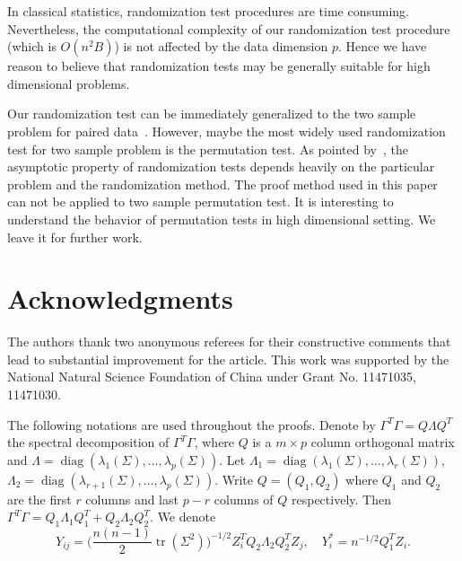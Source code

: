\documentclass[3p]{elsarticle}
\DeclareMathOperator{\mytr}{tr}
\DeclareMathOperator{\mydiag}{diag}
\theoremstyle{plain}
\theoremstyle{definition}
\theoremstyle{remark}
\begin{document}
In classical statistics, randomization test procedures are time consuming.
Nevertheless, the computational complexity of our randomization test procedure (which is $O(n^2 B)$) is not affected by the data dimension $p$. 
Hence we have reason to believe that randomization tests may be generally suitable for high dimensional problems.



Our randomization test can be immediately generalized to the two sample problem for paired data~\citep{Konietschke2014}.
However, maybe the most widely used randomization test for two sample problem is the permutation test.
As pointed by~\citet{Romano1990On}, the asymptotic property of randomization tests depends heavily on the particular problem and the randomization method.
The proof method used in this paper can not be applied to two sample permutation test.
 It is interesting to understand the behavior of permutation tests in high dimensional setting. We leave it for further work.


\section*{Acknowledgments}
{
The authors thank two anonymous referees for their constructive comments that lead to substantial improvement for the article.
    This work was supported by the National Natural Science Foundation of China under Grant No. 11471035, 11471030.
}

\appendix
\appendixpage
    The following notations are used throughout the proofs.
    Denote by $\Gamma^T \Gamma= Q\Lambda Q^T$ the spectral decomposition of $\Gamma^T \Gamma$, where  $Q$ is a $m\times p$ column orthogonal matrix and $\Lambda=\mydiag(\lambda_1(\Sigma),\ldots,\lambda_p(\Sigma))$.
    Let $\Lambda_{1}=\mydiag(\lambda_1(\Sigma),\ldots,\lambda_r(\Sigma))$, $\Lambda_{2}=\mydiag(\lambda_{r+1}(\Sigma),\ldots,\lambda_p(\Sigma))$.
    Write $Q=(Q_{1},Q_{2})$ where $Q_{1}$ and $Q_{2}$ are the first $r$ columns and last $p-r$ columns of $Q$ respectively.
    Then $\Gamma^T \Gamma=Q_1\Lambda_1 Q_1^T + Q_2 \Lambda_2 Q_2^T$.
We denote
$$
    Y_{ij}=\big(\frac{n(n-1)}{2} \mytr(\Sigma^2)\big)^{-1/2}Z_i^T Q_2 \Lambda_2 Q_2^T Z_j,
    \quad
    Y^*_i=n^{-1/2} Q_1^T Z_i.
$$

\end{document}
